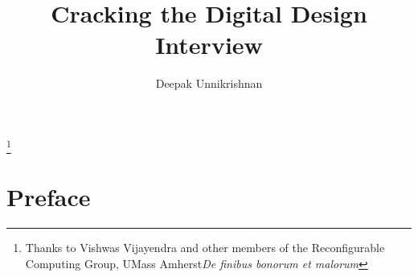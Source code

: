 \documentclass{book}
\begin{document}
\pagestyle{empty}
\title{\textbf{Cracking the Digital Design Interview}}
\author{Deepak Unnikrishnan}



\maketitle


\thispagestyle{empty}
\thanks{Thanks to Vishwas Vijayendra and other members of the Reconfigurable Computing Group, UMass Amherst\em{De finibus bonorum et malorum}}
\newpage




\pagestyle{fancy}
\fancyhf{}
\lhead[]{\thepage}
\rhead[\thepage]{}


\doublespacing



\chapter*{Preface}
\end{document}

